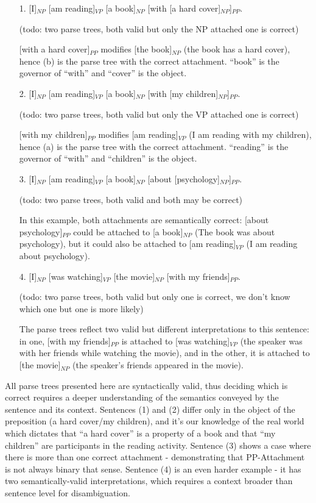 \begin{enumerate} \label{ex:ppatt}
    \item[1.] [I]$_{NP}$ [am reading]$_{VP}$ [a book]$_{NP}$ [with [a hard cover]$_{NP}$]$_{PP}$. 

    (todo: two parse trees, both valid but only the NP attached one is correct)

[with a hard cover]$_{PP}$ modifies [the book]$_{NP}$ (the book has a hard cover), hence (b) is the parse tree with the correct attachment. “book” is the governor of “with” and “cover” is the object.

    \item[2.] [I]$_{NP}$ [am reading]$_{VP}$ [a book]$_{NP}$ [with  [my children]$_{NP}$]$_{PP}$. 

    (todo: two parse trees, both valid but only the VP attached one is correct)

[with my children]$_{PP}$ modifies [am reading]$_{VP}$ (I am reading with my children), hence (a) is the parse tree with the correct attachment. “reading” is the governor of “with” and “children” is the object.

    \item[3.] [I]$_{NP}$ [am reading]$_{VP}$ [a book]$_{NP}$ [about [psychology]$_{NP}$]$_{PP}$. 

    (todo: two parse trees, both valid and both may be correct)

In this example, both attachments are semantically correct: [about psychology]$_{PP}$ could be attached to [a book]$_{NP}$ (The book was about psychology), but it could also be attached to [am reading]$_{VP}$ (I am reading about psychology).

    \item[4.] [I]$_{NP}$ [was watching]$_{VP}$ [the movie]$_{NP}$ [with my friends]$_{PP}$. 

    (todo: two parse trees, both valid but only one is correct, we don’t know which one but one is more likely) 

    The parse trees reflect two valid but different interpretations to this sentence: in one, [with my friends]$_{PP}$ is attached to [was watching]$_{VP}$ (the speaker was with her friends while watching the movie), and in the other, it is attached to [the movie]$_{NP}$ (the speaker’s friends appeared in the movie).

\end{enumerate}
 

All parse trees presented here are syntactically valid, thus deciding which is correct requires a deeper understanding of the semantics conveyed by the sentence and its context.
Sentences (1) and (2) differ only in the object of the preposition (a hard cover/my children), and it’s our knowledge of the real world which dictates that “a hard cover” is a property of a book and that “my children” are participants in the reading activity. Sentence (3) shows a case where there is more than one correct attachment - demonstrating that PP-Attachment is not always binary that sense. Sentence (4) is an even harder example - it has two semantically-valid interpretations, which requires a context broader than sentence level for disambiguation.  

